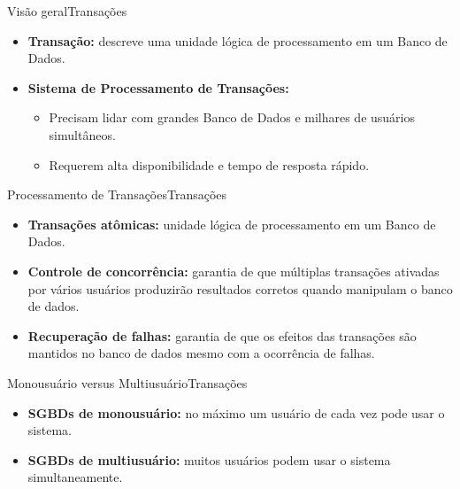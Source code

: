 \documentclass[t]{beamer}
\begin{document}

\begin{ftst}{Visão geral}{Transações}

\begin{itemize}
    \item \textbf{Transação: } descreve uma unidade lógica de processamento em um Banco de Dados.
    \item \textbf{Sistema de Processamento de Transações: } 
    \begin{itemize}
        \item Precisam lidar com grandes Banco de Dados e milhares de usuários simultâneos.
        \item Requerem alta disponibilidade e tempo de resposta rápido.
    \end{itemize}
\end{itemize}
\end{ftst}


\begin{ftst}{Processamento de Transações}{Transações}

\begin{itemize}
    \item \textbf{Transações atômicas: } unidade lógica de processamento em um Banco de Dados.
    \item \textbf{Controle de concorrência: } garantia de que múltiplas transações ativadas por vários usuários produzirão resultados corretos quando manipulam o banco de dados.
    \item \textbf{Recuperação de falhas: } garantia de que os efeitos das transações são mantidos no banco de dados mesmo com a ocorrência de falhas.

\end{itemize}
\end{ftst}


\begin{ftst}{Monousuário versus Multiusuário}{Transações}

\begin{itemize}
    \item \textbf{SGBDs de monousuário:} no máximo um usuário de cada vez pode usar o sistema. 
    \item \textbf{SGBDs de multiusuário:} muitos usuários podem usar o sistema simultaneamente.
\end{itemize}
\end{ftst}
\end{document}
